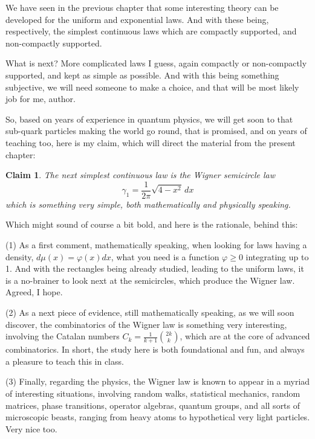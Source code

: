 \documentclass[12pt]{amsbook}
\newtheorem{claim}[theorem]{Claim}
\begin{document}
We have seen in the previous chapter that some interesting theory can be developed for the uniform and exponential laws. And with these being, respectively, the simplest continuous laws which are compactly supported, and non-compactly supported.

\bigskip

What is next? More complicated laws I guess, again compactly or non-compactly supported, and kept as simple as possible. And with this being something subjective, we will need someone to make a choice, and that will be most likely job for me, author.

\bigskip

So, based on years of experience in quantum physics, we will get soon to that sub-quark particles making the world go round, that is promised, and on years of teaching too, here is my claim, which will direct the material from the present chapter: 

\begin{claim}
The next simplest continuous law is the Wigner semicircle law
$$\gamma_1=\frac{1}{2\pi}\sqrt{4-x^2}\,dx$$
which is something very simple, both mathematically and physically speaking. 
\end{claim}

Which might sound of course a bit bold, and here is the rationale, behind this:

\bigskip

(1) As a first comment, mathematically speaking, when looking for laws having a density, $d\mu(x)=\varphi(x)dx$, what you need is a function $\varphi\geq0$ integrating up to 1. And with the rectangles being already studied, leading to the uniform laws, it is a no-brainer to look next at the semicircles, which produce the Wigner law. Agreed, I hope.

\bigskip

(2) As a next piece of evidence, still mathematically speaking, as we will soon discover, the combinatorics of the Wigner law is something very interesting, involving the Catalan numbers $C_k=\frac{1}{k+1}\binom{2k}{k}$, which are at the core of advanced combinatorics. In short, the study here is both foundational and fun, and always a pleasure to teach this in class. 

\bigskip

(3) Finally, regarding the physics, the Wigner law is known to appear in a myriad of interesting situations, involving random walks, statistical mechanics, random matrices, phase transitions, operator algebras, quantum groups, and all sorts of microscopic beasts, ranging from heavy atoms to hypothetical very light particles. Very nice too.
\end{document}
